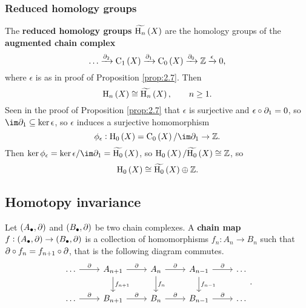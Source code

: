 \subsubsection{Reduced homology groups}

The \textbf{reduced homology groups} $ \widetilde{\H_n}\br{X} $ are the homology groups of the \textbf{augmented chain complex}
$$ \dots \xrightarrow{\da_2} \C_1\br{X} \xrightarrow{\da_1} \C_0\br{X} \xrightarrow{\da_0} \ZZ \xrightarrow{\epsilon} 0, $$
where $ \epsilon $ is as in proof of Proposition \ref{prop:2.7}. Then
$$ \H_n\br{X} \cong \widetilde{\H_n}\br{X}, \qquad n \ge 1. $$
Seen in the proof of Proposition \ref{prop:2.7} that $ \epsilon $ is surjective and $ \epsilon \circ \partial_1 = 0 $, so $ \im \da_1 \subseteq \ker \epsilon $, so $ \epsilon $ induces a surjective homomorphism
$$ \phi_\epsilon : \H_0\br{X} = \C_0\br{X} / \im \da_1 \to \ZZ. $$
Then $ \ker \phi_\epsilon = \ker \epsilon / \im \da_1 = \widetilde{\H_0}\br{X} $, so $ \H_0\br{X} / \widetilde{\H_0}\br{X} \cong \ZZ $, so
$$ \H_0\br{X} \cong \widetilde{\H_0}\br{X} \oplus \ZZ. $$

\pagebreak

\subsection{Homotopy invariance}


Let $ \br{A_\bullet, \da} $ and $ \br{B_\bullet, \da} $ be two chain complexes. A \textbf{chain map} $ f : \br{A_\bullet, \da} \to \br{B_\bullet, \da} $ is a collection of homomorphisms $ f_n : A_n \to B_n $ such that $ \partial \circ f_n = f_{n + 1} \circ \partial $, that is the following diagram commutes.
$$
\begin{tikzcd}
\dots \arrow{r}{\da} & A_{n + 1} \arrow{r}{\da} \arrow{d}{f_{n + 1}} & A_n \arrow{r}{\da} \arrow{d}{f_n} & A_{n - 1} \arrow{r}{\da} \arrow{d}{f_{n - 1}} & \dots \\
\dots \arrow{r}{\da} & B_{n + 1} \arrow{r}{\da} & B_n \arrow{r}{\da} & B_{n - 1} \arrow{r}{\da} & \dots
\end{tikzcd}.
$$

